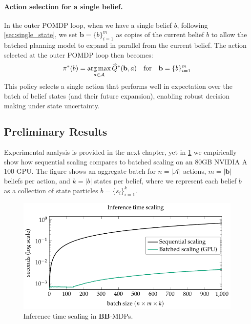 \paragraph{Action selection for a single belief.}
In the outer POMDP loop, when we have a single belief $b$, following \cref{sec:single_state}, we set $\mathbf{b} = \{b\}_{i=1}^m$ as copies of the current belief $b$ to allow the batched planning model to expand in parallel from the current belief.
The action selected at the outer POMDP loop then becomes:
\begin{equation}
    \pi^*(b) = \argmax_{a \in \mathcal{A}} \widehat{Q}^*(\mathbf{b}, a) \quad \text{for} \quad \mathbf{b} = \{b\}_{i=1}^m
\end{equation}
This policy selects a single action that performs well in expectation over the batch of belief states (and their future expansion), enabling robust decision making under state uncertainty.

\subsection{Preliminary Results}
Experimental analysis is provided in the next chapter, yet in \cref{fig:gpu_vs_cpu} we empirically show how sequential scaling compares to batched scaling on an $80$GB NVIDIA A$100$ GPU.
The figure shows an aggregate batch for $n = |\mathcal{A}|$ actions, $m = |\mathbf{b}|$ beliefs per action, and $k = |b|$ states per belief, where we represent each belief $b$ as a collection of state particles $b = \{s_i\}_{i=1}^k$.


\begin{figure}[t!]
    \centering
    \includegraphics[width=0.855\linewidth]{figures/bbmdp/gpu-vs-cpu}
    \caption{Inference time scaling in \textbf{BB}-MDPs.}
    \label{fig:gpu_vs_cpu}
\end{figure}


